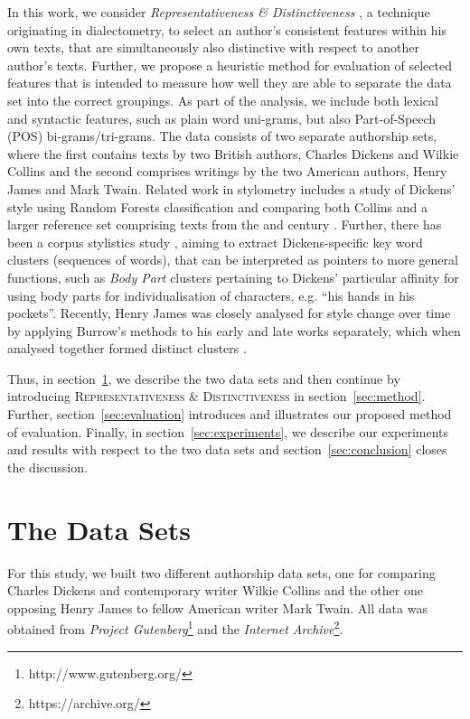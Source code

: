 \documentclass[a4paper,10pt,twoside,fleqn]{article}
\begin{document}

In this work, we consider \emph{Representativeness \& Distinctiveness}
\cite{prokic2012detecting}, a technique originating in dialectometry,
to select an author’s consistent features within his own texts, that
are simultaneously also distinctive with respect to another author’s texts.
Further, we propose a heuristic method for evaluation of
selected features that is intended to measure how well they are able to
separate the data set into the correct groupings.
As part of the analysis, we include both lexical and syntactic features,
such as plain word uni-grams, but also Part-of-Speech (POS)
bi-grams/tri-grams.
The data consists of two separate authorship sets, where the first
contains texts by two British authors, Charles Dickens and
Wilkie Collins and the second comprises writings by the two
American authors, Henry James and Mark Twain.
Related work in stylometry includes a study of Dickens' style using
Random Forests classification and
comparing both Collins and a larger reference set comprising
texts from the   and  century \cite{Tabata2012}.
Further, there has been a corpus stylistics study \cite{mahlberg2007clusters},
aiming to extract Dickens-specific key word clusters (sequences of words),
that can be interpreted as pointers to more general functions, such
as \emph{Body Part} clusters pertaining to Dickens' particular affinity for using
body parts for individualisation of characters, e.g. ``his hands in his pockets''.
Recently, Henry James was closely analysed for style change over time by
applying Burrow's methods to his early and late works separately, which
when analysed together formed distinct clusters \cite{Hoover2012}.


Thus, in section~\ref{sec:data}, we describe the two data sets and then continue by
introducing \textsc{Representativeness \& Distinctiveness}
in section~\ref{sec:method}. Further, section~\ref{sec:evaluation}
introduces and illustrates our proposed method of evaluation.
Finally, in section~\ref{sec:experiments}, we describe our experiments
and results with respect to the two data sets and section~\ref{sec:conclusion}
closes the discussion.


\section{The Data Sets} \label{sec:data}
For this study, we built two different authorship data sets, one for comparing Charles Dickens
and contemporary writer Wilkie Collins and the other one opposing Henry James
to fellow American writer Mark Twain.
All data was obtained from \emph{Project Gutenberg}\footnote{http://www.gutenberg.org/}
and the \emph{Internet Archive}\footnote{https://archive.org/}.
\end{document}
